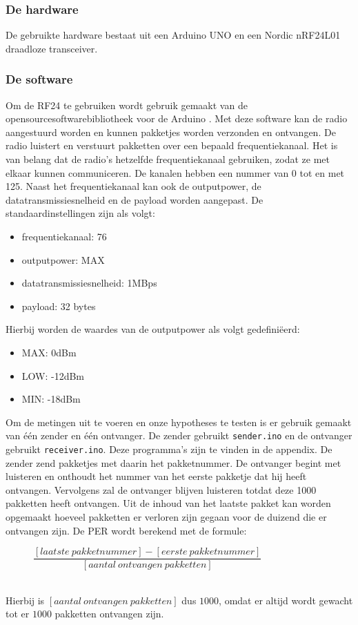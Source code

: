 \documentclass{article}
\begin{document}
\subsubsection{De hardware}
De gebruikte hardware bestaat uit een Arduino UNO en een Nordic nRF24L01 draadloze transceiver.

\subsubsection{De software}
Om de RF24 te gebruiken wordt gebruik gemaakt van de opensourcesoftwarebibliotheek voor de Arduino \cite{rf24}. Met deze software kan de radio aangestuurd worden en kunnen pakketjes worden verzonden en ontvangen. De radio luistert en verstuurt pakketten over een bepaald frequentiekanaal. Het is van belang dat de radio's hetzelfde frequentiekanaal gebruiken, zodat ze met elkaar kunnen communiceren. De kanalen hebben een nummer van 0 tot en met 125. Naast het frequentiekanaal kan ook de outputpower, de datatransmissiesnelheid en de payload worden aangepast. De standaardinstellingen zijn als volgt:
\begin{itemize}
	\item frequentiekanaal: 76
	\item outputpower: MAX
	\item datatransmissiesnelheid: 1MBps
	\item payload: 32 bytes
\end{itemize}
\label{outputpower}
Hierbij worden de waardes van de outputpower als volgt gedefini\"eerd:
\begin{itemize}
	\item MAX: 0dBm
	\item LOW: -12dBm
	\item MIN: -18dBm
\end{itemize}
Om de metingen uit te voeren en onze hypotheses te testen is er gebruik gemaakt van \'{e}\'{e}n zender en \'{e}\'{e}n ontvanger. De zender gebruikt \texttt{sender.ino} en de ontvanger gebruikt \texttt{receiver.ino}. Deze programma's zijn te vinden in de appendix. De zender zend pakketjes met daarin het pakketnummer. De ontvanger begint met luisteren en onthoudt het nummer van het eerste pakketje dat hij heeft ontvangen. Vervolgens zal de ontvanger blijven luisteren totdat deze 1000 pakketten heeft ontvangen. Uit de inhoud van het laatste pakket kan worden opgemaakt hoeveel pakketten er verloren zijn gegaan voor de duizend die er ontvangen zijn. De PER wordt berekend met de formule:\\
\begin{figure}[h]
\center
\indent	$\dfrac{[laatste\ pakketnummer]-[eerste\ pakketnummer]}{[aantal\ ontvangen\ pakketten]}$
\end{figure}\\
Hierbij is $[aantal\ ontvangen\ pakketten]$ dus $1000$, omdat er altijd wordt gewacht tot er $1000$ pakketten ontvangen zijn.
\end{document}
